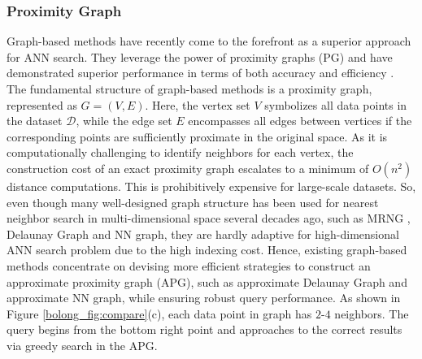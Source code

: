 \documentclass[11pt]{article}
\newcommand{\DD}{\mathrm{\mathcal{D}}}
\def\cred{\textcolor{red}}
\begin{document}
\subsubsection{Proximity Graph}
Graph-based methods have recently come to the forefront as a superior approach for ANN search. They leverage the power of proximity graphs (PG) and have demonstrated superior performance in terms of both accuracy and efficiency \cite{DBLP:journals/pami/MalkovY20,DBLP:journals/pr/MunozGDT19,DBLP:journals/pvldb/WangXY021}.
The fundamental structure of graph-based methods is a proximity graph, represented as $G=(V,E)$. Here, the vertex set $V$ symbolizes all data points in the dataset $\DD$, while the edge set $E$ encompasses all edges between vertices if the corresponding points are sufficiently proximate in the original space. As it is computationally challenging to identify neighbors for each vertex, the construction cost of an exact proximity graph escalates to a minimum of $O(n^2)$ distance computations. This is prohibitively expensive for large-scale datasets. So, even though many well-designed graph structure has been used for nearest neighbor search in multi-dimensional space several decades ago, such as MRNG \cite{DBLP:journals/dam/JaromczykK91}, Delaunay Graph and NN graph, they are hardly adaptive for high-dimensional ANN search problem due to the high indexing cost. Hence, existing graph-based methods concentrate on devising more efficient strategies to construct an approximate proximity graph (APG), such as approximate Delaunay Graph and approximate NN graph, while ensuring robust query performance. 
As shown in Figure \ref{bolong_fig:compare}(c), each data point in graph has $2$-$4$ neighbors. The query begins from the bottom right point and approaches to the correct results via greedy search in the APG.




\end{document}
